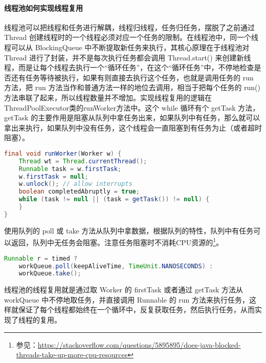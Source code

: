 \documentclass[../../../interview-questions.tex]{subfiles}
\begin{document}
\paragraph{线程池如何实现线程复用}

线程池可以把线程和任务进行解耦，线程归线程，任务归任务，摆脱了之前通过 Thread 创建线程时的一个线程必须对应一个任务的限制。在线程池中，同一个线程可以从 BlockingQueue 中不断提取新任务来执行，其核心原理在于线程池对 Thread 进行了封装，并不是每次执行任务都会调用 Thread.start() 来创建新线程，而是让每个线程去执行一个“循环任务”，在这个“循环任务”中，不停地检查是否还有任务等待被执行，如果有则直接去执行这个任务，也就是调用任务的 run 方法，把 run 方法当作和普通方法一样的地位去调用，相当于把每个任务的 run() 方法串联了起来，所以线程数量并不增加。实现线程复用的逻辑在ThreadPoolExecutor类的runWorker方法中。这个 while 循环有个 getTask 方法，getTask 的主要作用是阻塞从队列中拿任务出来，如果队列中有任务，那么就可以拿出来执行，如果队列中没有任务，这个线程会一直阻塞到有任务为止（或者超时阻塞）。

\begin{lstlisting}[language=Java]
final void runWorker(Worker w) {
    Thread wt = Thread.currentThread();
    Runnable task = w.firstTask;
    w.firstTask = null;
    w.unlock(); // allow interrupts
    boolean completedAbruptly = true;
    while (task != null || (task = getTask()) != null) {
    }
}
\end{lstlisting}

使用队列的 poll 或 take 方法从队列中拿数据，根据队列的特性，队列中有任务可以返回，队列中无任务会阻塞。注意任务阻塞时不消耗CPU资源的\footnote{参见：\url{https://stackoverflow.com/questions/5895895/does-java-blocked-threads-take-up-more-cpu-resources}}。

\begin{lstlisting}[language=Java]
Runnable r = timed ?
    workQueue.poll(keepAliveTime, TimeUnit.NANOSECONDS) :
    workQueue.take();
\end{lstlisting}
    

线程池的线程复用就是通过取 Worker 的 firstTask 或者通过 getTask 方法从 workQueue 中不停地取任务，并直接调用 Runnable 的 run 方法来执行任务，这样就保证了每个线程都始终在一个循环中，反复获取任务，然后执行任务，从而实现了线程的复用。
\end{document}

